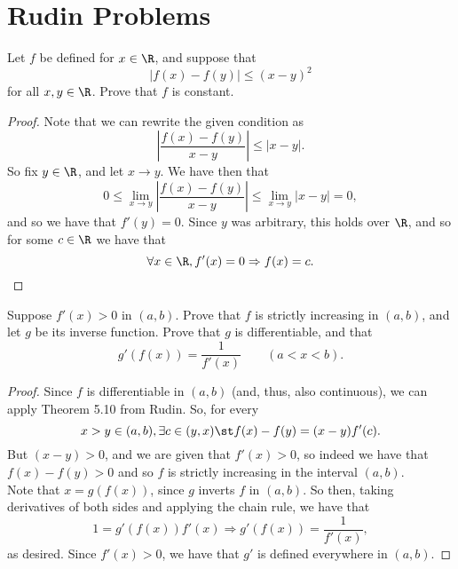 \documentclass{assignment}
\begin{document}
\maketitle

\section*{Rudin Problems}
\begin{question}[5.1]
 Let $f$ be defined for $x\in\R$, and suppose that $$|f(x) - f(y)| \leq (x-y)^2$$ for all
$x,y\in\R$. Prove that $f$ is constant. 
\end{question}
\begin{proof}
  Note that we can rewrite the given condition as $$\left|\frac{f(x) - f(y)}{x - y}\right| \leq |x -
y|.$$ So fix $y \in\R$, and let $x \to y$. We have then that 
$$0 \leq \lim_{x\to y} \left|\frac{f(x) - f(y)}{x - y}\right| \leq \lim_{x\to y} |x - y| = 0,$$ and
so we have that $f'(y) = 0$. Since $y$ was arbitrary, this holds over $\R$, and so for some $c\in\R$
we have that
$$\forall x\in\R, f'(x) = 0 \Rightarrow f(x) = c.$$
\end{proof}

\begin{question}[5.2]
 Suppose $f'(x) > 0$ in $(a,b)$. Prove that $f$ is strictly increasing in $(a,b)$, and let $g$ be
its inverse function. Prove that $g$ is differentiable, and that $$g'(f(x)) = \frac{1}{f'(x)} \qquad
(a < x < b).$$ 
\end{question}
\begin{proof}
  Since $f$ is differentiable in $(a,b)$ (and, thus, also continuous), we can apply Theorem 5.10
from Rudin. So, for every $$x > y \in (a,b), \exists c\in (y, x) \st f(x) - f(y) = (x - y)f'(c).$$
But $(x-y) > 0$, and we are given that $f'(x) > 0$, so indeed we have that $f(x) - f(y) > 0$ and so
$f$ is strictly increasing in the interval $(a,b)$. \\

Note that $x = g(f(x))$, since $g$ inverts $f$ in $(a,b)$. So then, taking derivatives of both sides
and applying the chain rule, we have that 
$$1 = g'(f(x))f'(x) \Rightarrow g'(f(x)) = \frac{1}{f'(x)},$$ as desired. Since $f'(x) > 0$, we have
that $g'$ is defined everywhere in $(a,b)$.
\end{proof}
\end{document}
